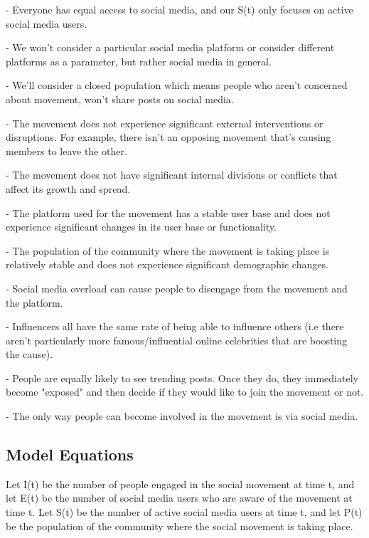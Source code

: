 \documentclass{article}
\begin{document}
    \enu
    
    - Everyone has equal access to social media, and our S(t) only focuses on active social media users.
    
    - We won't consider a particular social media platform or consider different platforms as a parameter, but rather social media in general. 
    
    - We'll consider a closed population which means people who aren't concerned about movement, won't share posts on social media. 
    
    - The movement does not experience significant external interventions or disruptions. For example, there isn't an opposing movement that's causing members to leave the other. 
    
    - The movement does not have significant internal divisions or conflicts that affect its growth and spread.
    
    - The platform used for the movement has a stable user base and does not experience significant changes in its user base or functionality.

    - The population of the community where the movement is taking place is relatively stable and does not experience significant demographic changes.

    - Social media overload can cause people to disengage from the movement and the platform.

    - Influencers all have the same rate of being able to influence others (i.e there aren’t particularly more famous/influential online celebrities that are boosting the cause). 

    - People are equally likely to see trending posts. Once they do, they immediately become "exposed" and then decide if they would like to join the movement or not. 

    - The only way people can become involved in the movement is via social media. 

    \subsection{Model Equations}

     Let I(t) be the number of people engaged in the social movement at time t, and let E(t) be the number of social media users who are aware of the movement at time t. Let S(t) be the number of active social media users at time t, and let P(t) be the population of the community where the social movement is taking place. 
\end{document}

